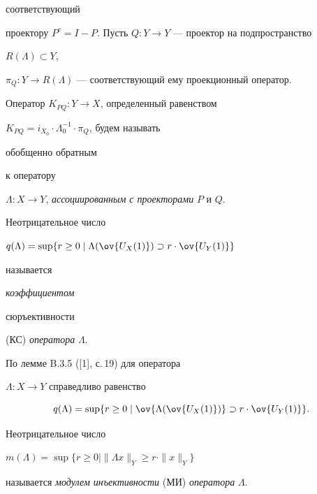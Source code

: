 соответствующий 


проектору $P^c=I-P$. Пусть $Q:Y\to Y$ --- проектор на подпространство  


$R(\Lambda)\subset Y$, 


$\pi_Q:Y\to R(\Lambda)$ --- соответствующий ему проекционный оператор.  


 


\begin{defn} Оператор $K_{PQ}:Y\to X$, определенный равенством  


$K_{PQ}=i_{X_0}\cdot\Lambda^{-1}_0\cdot\pi_Q$, будем называть {\it 


обобщенно обратным} к оператору 


$\Lambda:X\to Y$, {\it ассоциированным с проекторами} $P$ и $Q$.  


\end{defn} 


 


\begin{defn} Неотрицательное число 


$q(\Lambda)=\sup\{r\ge 0\mid\Lambda(\ov{U_X(1)})\supset 


r\cdot\ov{U_Y(1)}\}$ 


называется {\it коэффициентом 


сюръективности} (КС) {\it оператора} $\Lambda$. 


\end{defn} 


 


По лемме B.3.5 ([1], с.\,19) для оператора 


$\Lambda:X\to Y$ справедливо равенство 


\begin{equation} 


q(\Lambda)=\sup\{r\ge 0\mid


\ov{\Lambda(\ov{U_X(1)})}\supset r\cdot\ov{U_Y(1)}\}. 


\end{equation} 


 


\begin{defn} Неотрицательное число 


$m(\Lambda)=\sup\{r\ge 0\mid\|\Lambda x\|_Y\ge r\cdot\|x\|_Y\}$ 


называется {\it модулем инъективности} (МИ) {\it оператора} $\Lambda$. 


\end{defn} 


